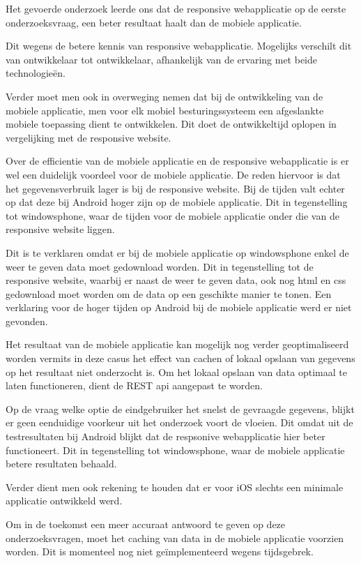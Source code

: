 Het gevoerde onderzoek leerde ons dat de responsive webapplicatie op de eerste onderzoeksvraag, een beter resultaat haalt dan de mobiele applicatie.

Dit wegens de betere kennis van responsive webapplicatie. Mogelijks verschilt dit van ontwikkelaar tot ontwikkelaar,
afhankelijk van de ervaring met beide technologieën.

Verder moet men ook in overweging nemen dat bij de ontwikkeling van de mobiele applicatie, men voor elk mobiel besturingssysteem een afgeslankte mobiele toepassing dient te ontwikkelen.
Dit doet de ontwikkeltijd oplopen in vergelijking met de responsive website.

Over de efficientie van de mobiele applicatie en de responsive webapplicatie is er wel een duidelijk voordeel voor de mobiele applicatie.
De reden hiervoor is dat het gegevensverbruik lager is bij de responsive website.
Bij de tijden valt echter op dat deze bij Android hoger zijn op de mobiele applicatie. Dit in tegenstelling tot windowsphone, waar de tijden voor de mobiele applicatie onder die van de responsive website liggen.

Dit is te verklaren omdat er bij de mobiele applicatie op windowsphone enkel de weer te geven data moet gedownload worden. Dit in tegenstelling tot de responsive website, waarbij er naast de weer te geven data, ook nog html
en css gedownload moet worden om de data op een geschikte manier te tonen. Een verklaring voor de hoger tijden op Android bij de mobiele applicatie werd er niet gevonden.

Het resultaat van de mobiele applicatie kan mogelijk nog verder geoptimaliseerd worden vermits in deze casus het effect van cachen of lokaal opslaan van gegevens op het resultaat niet onderzocht is.
Om het lokaal opslaan van data optimaal te laten functioneren, dient de REST api aangepast te worden.

Op de vraag welke optie de eindgebruiker het snelst de gevraagde gegevens, blijkt er geen eenduidige voorkeur uit het onderzoek voort de vloeien.
Dit omdat uit de testresultaten bij Android blijkt dat de respsonive webapplicatie hier beter functioneert. Dit in tegenstelling tot windowsphone, waar de mobiele applicatie betere
resultaten behaald.

Verder dient men ook rekening te houden dat er voor iOS slechts een minimale applicatie ontwikkeld werd.

Om in de toekomst een meer accuraat antwoord te geven op deze onderzoeksvragen, moet het caching van data in de mobiele applicatie voorzien worden.
Dit is momenteel nog niet geïmplementeerd wegens tijdsgebrek.
